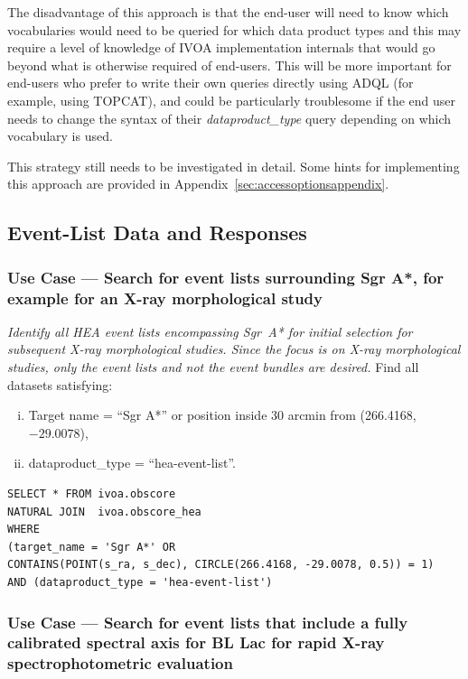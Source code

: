 \begin{itemize}
The disadvantage of this approach is that the end-user will need to know which vocabularies would need to be queried for which data product types and this may require a level of knowledge of IVOA implementation internals that would go beyond what is otherwise required of end-users.  This will be more important for end-users who prefer to write their own queries directly using ADQL (for example, using TOPCAT), and could be particularly troublesome if the end user needs to change the syntax of their {\em dataproduct\_type\/} query depending on which vocabulary is used.

This strategy still needs to be investigated in detail.  Some hints for implementing this approach are provided in Appendix~\ref{sec:accessoptionsappendix}. 
\end{itemize} 

\subsection{Event-List Data and Responses}

\subsubsection{Use Case --- Search for event lists surrounding Sgr A*, for example for an X-ray morphological study}

{\em Identify all \gls{HEA} event lists encompassing Sgr~A* for initial selection for subsequent X-ray morphological studies.  Since the focus is on X-ray morphological studies, only the event lists and not the event bundles are desired.\/}
\medskip
\noindent Find all datasets satisfying:
\begin{enumerate}[(i)]
  \item Target name = ``Sgr A*'' or position inside 30 arcmin from (266.4168, $-29.0078$),
  \item dataproduct\_type = ``hea-event-list''.
\end{enumerate}

\begin{verbatim}
SELECT * FROM ivoa.obscore
NATURAL JOIN  ivoa.obscore_hea
WHERE
(target_name = 'Sgr A*' OR
CONTAINS(POINT(s_ra, s_dec), CIRCLE(266.4168, -29.0078, 0.5)) = 1)
AND (dataproduct_type = 'hea-event-list')
\end{verbatim}


\subsubsection{Use Case --- Search for event lists that include a fully calibrated spectral axis for BL Lac for rapid X-ray spectrophotometric evaluation}

